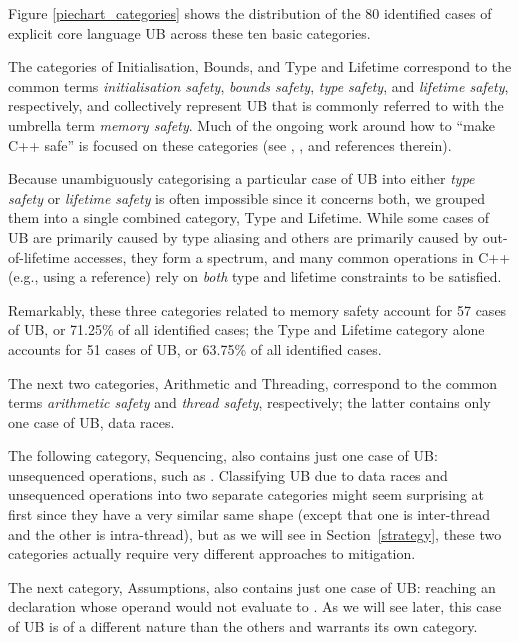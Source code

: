 Figure \ref{piechart_categories} shows the distribution of the 80 identified cases of explicit core language UB across these ten basic categories. 



The categories of Initialisation, Bounds, and Type and Lifetime correspond to the common terms \emph{initialisation safety}, \emph{bounds safety}, \emph{type safety},  and \emph{lifetime safety}, respectively, and collectively represent UB that is commonly referred to with the umbrella term \emph{memory safety}. Much of the ongoing work around how to ``make C++ safe'' is focused on these  categories (see \cite{P3081R2}, \cite{P3700R0}, and references therein).

Because unambiguously categorising a particular case of UB into either \emph{type safety} or \emph{lifetime safety} is often impossible since it concerns both, we grouped them into a single combined category, Type and Lifetime. While some cases of UB are primarily caused by type aliasing and others are primarily caused by out-of-lifetime accesses, they form a spectrum, and many common operations in C++ (e.g., using a reference) rely on \emph{both} type and lifetime constraints to be satisfied.

Remarkably, these three categories related to memory safety account for 57 cases of UB, or 71.25\% of all identified cases; the Type and Lifetime category alone accounts for 51 cases of UB, or 63.75\% of all identified cases.

The next two categories, Arithmetic and Threading, correspond to the common terms \emph{arithmetic safety} and \emph{thread safety}, respectively; the latter contains only one case of UB, data races.

The following category, Sequencing, also contains just one case of UB: unsequenced operations, such as \mbox{}. Classifying UB due to data races and unsequenced operations into two separate categories might seem surprising at first since they have a very similar same shape (except that one is inter-thread and the other is intra-thread), but as we will see in Section~\ref{strategy}, these two categories actually require very different approaches to mitigation.

The next category, Assumptions, also contains just one case of UB: reaching an \tcode{[[assume]]} declaration whose operand would not evaluate to . As we will see later, this case of UB is of a different nature than the others and warrants its own category.

